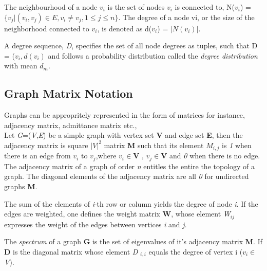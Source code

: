 The neighbourhood of a node $v_i$ is the set of
nodes $v_i$ is connected to, N($v_i$) = $\{v_j | (v_i, v_j) \in E, v_i \neq
v_j, 1 \leq j \leq n\}$. The degree of a node vi, or the size of
the neighborhood connected to $v_i$, is denoted as d($v_i$) =
$|N(v_i)|$. 
\par A degree sequence, \textit{D}, specifies the set of all node
degrees as tuples, such that D = {($v_i, d(v_i)$} and follows a
probability distribution called the \textit{degree distribution} with
mean $d_m$. \cite{githubtest1}

\subsection{Graph Matrix Notation}
Graphs can be appropritely represented in the form of matrices for instance, adjacency matrix, admittance matrix etc.,
\\
Let \textit{G}=(\textit{V},\textit{E}) be a simple graph with vertex set \textbf{V} and edge set \textbf{E}, then the adjacency matrix is square $|V|^2$ matrix \textbf{M} such that its element $M_{i,j}$ is \textit{1} when there is an edge from $v_i$ to $v_j$,where $v_i \in \textbf{V}$ , $ v_j \in \textbf{V}$ and \textit{0} when there is no edge.
The adjacency matrix of a graph of order \textit{n} entitles the entire the topology of a graph.  The diagonal elements of the adjacency matrix are all \textit{0} for undirected graphs \textbf{M}.
\par The sum of the elements of \textit{i}-th row or column yields the degree of node \textit{i}. If the edges are weighted, one defines the weight matrix \textbf{W}, whose element \textit{W}$_{ij}$ expresses the weight of the edges between vertices \textit{i} and \textit{j}.

\par The \textit{spectrum} of a graph \textbf{G} is the set of eigenvalues of it's adjacency matrix \textbf{M}. If \textbf{D}  is the diagonal matrix whose element \textit{D} $_{i,i}$ equals the degree of vertex i ($v_i \in$ \textit{V}).



